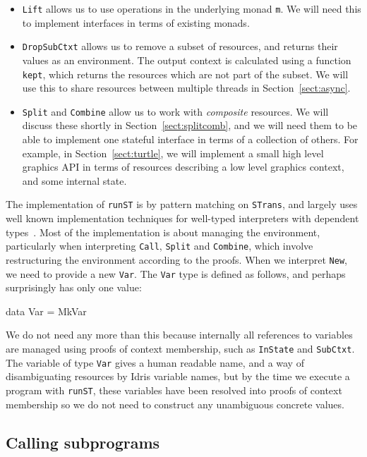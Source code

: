 \begin{itemize}
\item \texttt{Lift} allows us to use operations in the underlying monad
\texttt{m}. We will need this to implement interfaces in terms of existing
monads.
\item \texttt{DropSubCtxt} allows us to remove a subset of resources, and
returns their values as an environment.  The output context is calculated using
a function \texttt{kept}, which returns the resources which are not part of the
subset. We will use this to share resources between multiple threads in
Section~\ref{sect:async}.
\item \texttt{Split} and \texttt{Combine} allow us to work with
\emph{composite} resources. We will discuss these shortly in
Section~\ref{sect:splitcomb}, and we will need them to be able to implement one
stateful interface in terms of a collection of others. For example, in
Section~\ref{sect:turtle}, we will implement a small high level graphics API
in terms of resources describing a low level graphics context, and some
internal state.
\end{itemize}

The implementation of \texttt{runST} is by pattern matching on \texttt{STrans},
and largely uses well known implementation techniques for well-typed interpreters
with dependent types~\citep{Pasalic2002,augustsson1999exercise}. Most of
the implementation is about managing the environment, particularly
when interpreting \texttt{Call}, \texttt{Split} and \texttt{Combine}, which
involve restructuring the environment according to the proofs.
%
When we interpret \texttt{New}, we need to provide a new \texttt{Var}.
The \texttt{Var} type is defined as follows, and perhaps surprisingly has only
one value:

\small
\begin{code}
data Var = MkVar
\end{code}
\normalsize

We do not need any more than this because internally all references
to variables are managed using proofs of context membership, such as
\texttt{InState} and \texttt{SubCtxt}. The variable of type \texttt{Var} 
gives a human readable name, and a way of disambiguating resources by Idris
variable names, but by the time we execute a program with \texttt{runST}, these
variables have been resolved into proofs of context membership so we do
not need to construct any unambiguous concrete values.

\subsection{Calling subprograms}

